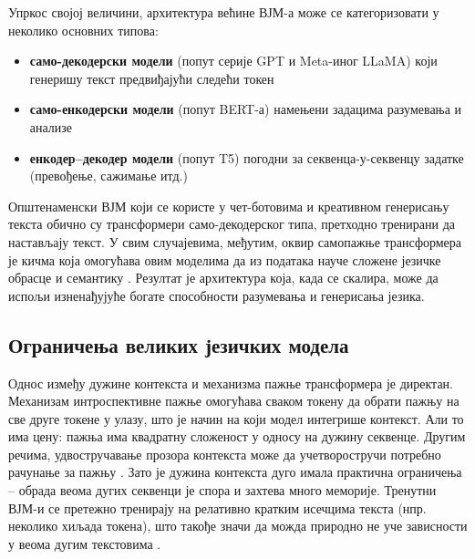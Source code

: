 Упркос својој величини, архитектура већине ВЈМ-а може се категоризовати у неколико основних типова:

\begin{itemize}
\item \textbf{само-декодерски модели} (попут серије GPT и Meta-иног LLaMA) који генеришу текст предвиђајући следећи токен
\item \textbf{само-енкодерски модели} (попут BERT-а) намењени задацима разумевања и анализе
\item \textbf{енкодер--декодер модели} (попут T5) погодни за секвенца-у-секвенцу задатке (превођење, сажимање итд.) \cite{vaswani_attention_2017,lu_large_2024}
\end{itemize}

Општенаменски ВЈМ који се користе у чет-ботовима и креативном генерисању текста обично су трансформери само-декодерског типа, претходно тренирани да настављају текст. У свим случајевима, међутим, оквир самопажње трансформера је кичма која омогућава овим моделима да из података науче сложене језичке обрасце и семантику \cite{vaswani_attention_2017}. Резултат је архитектура која, када се скалира, може да испољи изненађујуће богате способности разумевања и генерисања језика.

\subsection{Ограничења великих језичких модела}

Однос између дужине контекста и механизма пажње трансформера је директан. Механизам интроспективне пажње омогућава сваком токену да обрати пажњу на све друге токене у улазу, што је начин на који модел интегрише контекст. Али то има цену: пажња има квадратну сложеност у односу на дужину секвенце. Другим речима, удвостручавање прозора контекста може да учетворостручи потребно рачунање за пажњу \cite{vaswani_attention_2017,lu_large_2024}. Зато је дужина контекста дуго имала практична ограничења -- обрада веома дугих секвенци је спора и захтева много меморије. Тренутни ВЈМ-и се претежно тренирају на релативно кратким исечцима текста (нпр. неколико хиљада токена), што такође значи да можда природно не уче зависности у веома дугим текстовима \cite{lu_large_2024}.


